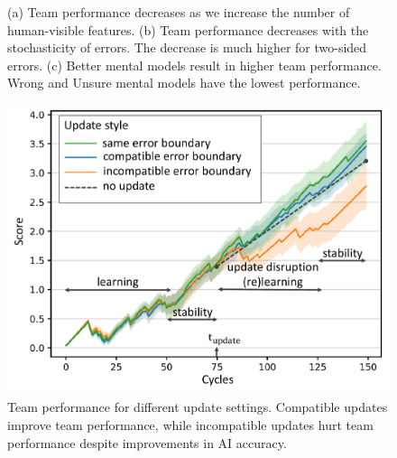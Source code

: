 \documentclass[letterpaper]{article} %
\newcommand{\bug}
    {\mbox{\rule{2mm}{2mm}}}
\newcommand{\Bug}[1]
    {\bug \footnote{BUG: {#1}}}
\newcommand{\?}{\mbox{?}}
\begin{document}
\begin{figure}[t]
\begin{subfigure}[b]{0.47\columnwidth}
    \caption{}
    \label{fig:wsl}
  \end{subfigure}
  
  \caption{(a) Team performance decreases as we increase the number of human-visible features. (b) Team performance decreases with the stochasticity of errors. The decrease is much higher for two-sided errors. (c) Better mental models result in higher team performance. Wrong and Unsure mental models have the lowest performance. 
  }
  \label{fig:complexity}
\end{figure}

\begin{figure}[t]
  \centering
    \includegraphics[width=\columnwidth]{update_study.pdf}
    \caption{Team performance for different update settings. Compatible updates improve team performance, while incompatible updates hurt team performance  despite improvements in AI accuracy.}
    \label{fig:updateExp}
\end{figure}
\end{document}
